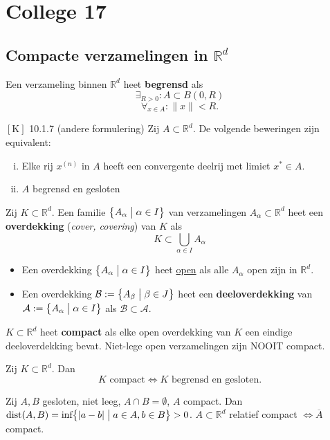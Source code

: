 \documentclass[a4paper]{exam}
\theoremstyle{definition}
\begin{document}
\section{College 17}
	\subsection{Compacte verzamelingen in $\mathbb{R}^d$}
		 Een verzameling binnen $\mathbb{R}^d$ heet \textbf{begrensd} als \[\exists _{R>0}: A \subset B(0,R)\]
		\[\forall _{x\in A}: \|x\|<R.\]
		
		\theorem $\left[\text{K}\right]$ 10.1.7 (andere formulering)
			  Zij $A \subset \mathbb{R}^d$. De volgende beweringen zijn equivalent:
			\begin{enumerate}[(i)]
				\item Elke rij $x^{(n)}$ in $A$ heeft een convergente deelrij met limiet $x^* \in A$.
				\item $A$ begrensd en gesloten
			\end{enumerate}
		
		 Zij $K \subset \mathbb{R}^d$. Een familie $\big\{A_\alpha \bigm| \alpha \in I \big\}$ van verzamelingen $A_\alpha \subset \mathbb{R}^d$ heet een \textbf{overdekking} (\textit{cover, covering}) van $K$ als \[K \subset \bigcup_{\alpha \in I}A_\alpha\]
		
		\begin{itemize}
			\item Een overdekking $\big\{ A_\alpha \bigm| \alpha \in I \big\}$ heet \underline{open} als alle $A_\alpha$ open zijn in $\mathbb{R}^d$.
			\item Een overdekking $\mathcal{B}:=\big\{ A_\beta \bigm| \beta \in J\big\}$ heet een \textbf{deeloverdekking} van $\mathcal{A}:=\big\{ A_\alpha \bigm| \alpha \in I \big\}$ als $\mathcal{B} \subset \mathcal{A}$.
		\end{itemize}
		
		 $K \subset \mathbb{R}^d$ heet \textbf{compact} als elke open overdekking van $K$ een eindige deeloverdekking bevat.
		\note Niet-lege open verzamelingen zijn NOOIT compact.
		
			Zij $K \subset \mathbb{R}^d$. Dan \[K \text{ compact}\Leftrightarrow K \text{ begrensd en gesloten.}\]
			
		\theorem Zij $A,B$ gesloten, niet leeg, $A\cap B = \emptyset$, $A$ compact.
			  Dan $\text{dist}(A,B) = \text{inf}\big\{ |a-b| \bigm| a \in A, b \in B \big\} > 0$.
			\opm $A \subset \mathbb{R}^d$ relatief compact $\Leftrightarrow \overline{A}$ compact.
\end{document}
